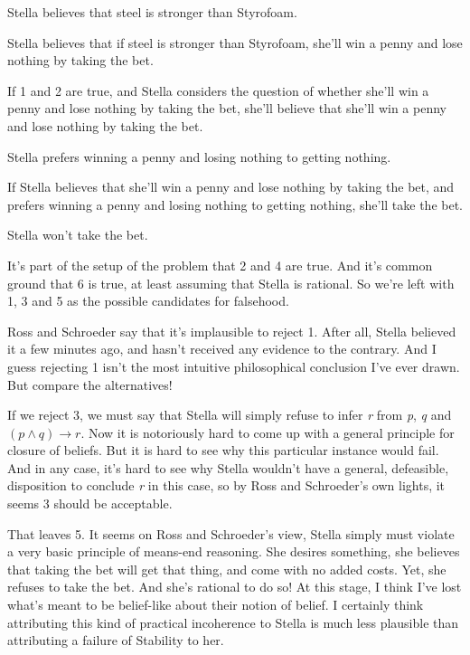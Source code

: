 \begin{enumerate*}
\item Stella believes that steel is stronger than Styrofoam.

\item Stella believes that if steel is stronger than Styrofoam, she'll win a penny and lose nothing by taking the bet.

\item If 1 and 2 are true, and Stella considers the question of whether she'll win a penny and lose nothing by taking the bet, she'll believe that she'll win a penny and lose nothing by taking the bet.

\item Stella prefers winning a penny and losing nothing to getting nothing.

\item If Stella believes that she'll win a penny and lose nothing by taking the bet, and prefers winning a penny and losing nothing to getting nothing, she'll take the bet.

\item Stella won't take the bet.

\end{enumerate*}
It's part of the setup of the problem that 2 and 4 are true. And it's common ground that 6 is true, at least assuming that Stella is rational. So we're left with 1, 3 and 5 as the possible candidates for falsehood.

Ross and Schroeder say that it's implausible to reject 1. After all, Stella believed it a few minutes ago, and hasn't received any evidence to the contrary. And I guess rejecting 1 isn't the most intuitive philosophical conclusion I've ever drawn. But compare the alternatives!

If we reject 3, we must say that Stella will simply refuse to infer \emph{r} from \emph{p}, \emph{q} and $(p \wedge q) \rightarrow r$. Now it is notoriously hard to come up with a general principle for closure of beliefs. But it is hard to see why this particular instance would fail. And in any case, it's hard to see why Stella wouldn't have a general, defeasible, disposition to conclude \emph{r} in this case, so by Ross and Schroeder's own lights, it seems 3 should be acceptable.

That leaves 5. It seems on Ross and Schroeder's view, Stella simply must violate a very basic principle of means-end reasoning. She desires something, she believes that taking the bet will get that thing, and come with no added costs. Yet, she refuses to take the bet. And she's rational to do so! At this stage, I think I've lost what's meant to be belief-like about their notion of belief. I certainly think attributing this kind of practical incoherence to Stella is much less plausible than attributing a failure of Stability to her.

